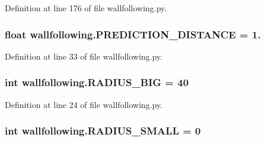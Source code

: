 Definition at line 176 of file wallfollowing.\+py.

\subsubsection[{\texorpdfstring{P\+R\+E\+D\+I\+C\+T\+I\+O\+N\+\_\+\+D\+I\+S\+T\+A\+N\+CE}{PREDICTION_DISTANCE}}]{\setlength{\rightskip}{0pt plus 5cm}float wallfollowing.\+P\+R\+E\+D\+I\+C\+T\+I\+O\+N\+\_\+\+D\+I\+S\+T\+A\+N\+CE = 1.}\hypertarget{namespacewallfollowing_a40e67d731c86a71ce7d1b8c17bff0514}{}\label{namespacewallfollowing_a40e67d731c86a71ce7d1b8c17bff0514}


Definition at line 33 of file wallfollowing.\+py.

\subsubsection[{\texorpdfstring{R\+A\+D\+I\+U\+S\+\_\+\+B\+IG}{RADIUS_BIG}}]{\setlength{\rightskip}{0pt plus 5cm}int wallfollowing.\+R\+A\+D\+I\+U\+S\+\_\+\+B\+IG = 40}\hypertarget{namespacewallfollowing_a4b502375f79f9fcc2a823cc60da7bee0}{}\label{namespacewallfollowing_a4b502375f79f9fcc2a823cc60da7bee0}


Definition at line 24 of file wallfollowing.\+py.

\subsubsection[{\texorpdfstring{R\+A\+D\+I\+U\+S\+\_\+\+S\+M\+A\+LL}{RADIUS_SMALL}}]{\setlength{\rightskip}{0pt plus 5cm}int wallfollowing.\+R\+A\+D\+I\+U\+S\+\_\+\+S\+M\+A\+LL = 0}\hypertarget{namespacewallfollowing_aa59c6dfd10cb4f1550367b3268417436}{}\label{namespacewallfollowing_aa59c6dfd10cb4f1550367b3268417436}


